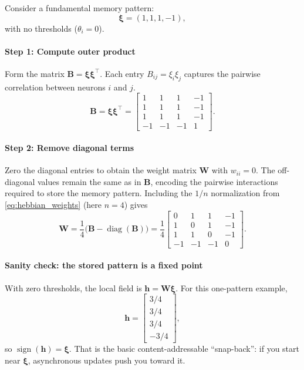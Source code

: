 Consider a fundamental memory pattern:
\[
\mathbf{\xi} = (1, 1, 1, -1),
\]
with no thresholds (\( \theta_i = 0 \)).

\paragraph{Step 1: Compute outer product}
Form the matrix \( \mathbf{B} = \mathbf{\xi} \mathbf{\xi}^\top \). Each entry \(B_{ij} = \xi_i \xi_j\) captures the pairwise correlation between neurons \(i\) and \(j\).
\[
\mathbf{B}
=
\mathbf{\xi}\mathbf{\xi}^\top
=
\begin{bmatrix}
1 & 1 & 1 & -1 \\
1 & 1 & 1 & -1 \\
1 & 1 & 1 & -1 \\
-1 & -1 & -1 & 1
\end{bmatrix}.
\]

\paragraph{Step 2: Remove diagonal terms}
Zero the diagonal entries to obtain the weight matrix \( \mathbf{W} \) with \(w_{ii} = 0\). The off-diagonal values remain the same as in \(\mathbf{B}\), encoding the pairwise interactions required to store the memory pattern.
Including the \(1/n\) normalization from \eqref{eq:hebbian_weights} (here \(n=4\)) gives
\[
\mathbf{W}
=
\frac{1}{4}\Big(\mathbf{B}-\operatorname{diag}(\mathbf{B})\Big)
=
\frac{1}{4}
\begin{bmatrix}
0 & 1 & 1 & -1 \\
1 & 0 & 1 & -1 \\
1 & 1 & 0 & -1 \\
-1 & -1 & -1 & 0
\end{bmatrix}.
\]

\paragraph{Sanity check: the stored pattern is a fixed point}
With zero thresholds, the local field is \(\mathbf{h}=\mathbf{W}\mathbf{\xi}\). For this one-pattern example,
\[
\mathbf{h}
=
\begin{bmatrix}
3/4 \\
3/4 \\
3/4 \\
-3/4
\end{bmatrix},
\]
so \(\operatorname{sign}(\mathbf{h})=\mathbf{\xi}\). That is the basic content-addressable ``snap-back'': if you start near \(\mathbf{\xi}\), asynchronous updates push you toward it.

